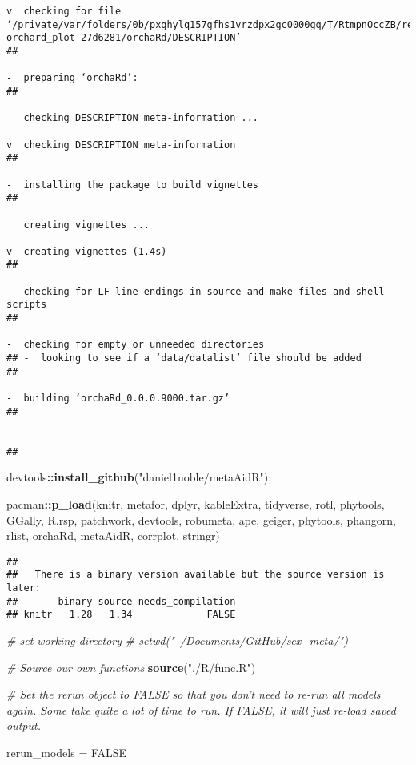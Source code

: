 \documentclass[]{article}
\newenvironment{Shaded}{\begin{snugshade}}{\end{snugshade}}
\newcommand{\KeywordTok}[1]{\textcolor[rgb]{0.13,0.29,0.53}{\textbf{#1}}}
\newcommand{\StringTok}[1]{\textcolor[rgb]{0.31,0.60,0.02}{#1}}
\newcommand{\CommentTok}[1]{\textcolor[rgb]{0.56,0.35,0.01}{\textit{#1}}}
\newcommand{\OtherTok}[1]{\textcolor[rgb]{0.56,0.35,0.01}{#1}}
\newcommand{\OperatorTok}[1]{\textcolor[rgb]{0.81,0.36,0.00}{\textbf{#1}}}
\newcommand{\NormalTok}[1]{#1}
\begin{document}
\begin{verbatim}
v  checking for file ‘/private/var/folders/0b/pxghylq157gfhs1vrzdpx2gc0000gq/T/RtmpnOccZB/remotes31ac7b962c89/itchyshin-orchard_plot-27d6281/orchaRd/DESCRIPTION’
## 
  
-  preparing ‘orchaRd’:
## 
  
   checking DESCRIPTION meta-information ...
  
v  checking DESCRIPTION meta-information
## 
  
-  installing the package to build vignettes
## 
  
   creating vignettes ...
  
v  creating vignettes (1.4s)
## 
  
-  checking for LF line-endings in source and make files and shell scripts
## 
  
-  checking for empty or unneeded directories
## -  looking to see if a ‘data/datalist’ file should be added
## 
  
-  building ‘orchaRd_0.0.0.9000.tar.gz’
## 
  
   
## 
\end{verbatim}

\begin{Shaded}
\begin{Highlighting}[]
\NormalTok{  devtools}\OperatorTok{::}\KeywordTok{install_github}\NormalTok{(}\StringTok{"daniel1noble/metaAidR"}\NormalTok{); }

\NormalTok{pacman}\OperatorTok{::}\KeywordTok{p_load}\NormalTok{(knitr, metafor, dplyr, kableExtra, tidyverse, rotl, phytools, GGally, R.rsp, patchwork, devtools, robumeta, ape, geiger, phytools, phangorn, rlist, orchaRd, metaAidR, corrplot, stringr)}
\end{Highlighting}
\end{Shaded}

\begin{verbatim}
## 
##   There is a binary version available but the source version is later:
##       binary source needs_compilation
## knitr   1.28   1.34             FALSE
\end{verbatim}

\begin{Shaded}
\begin{Highlighting}[]
\CommentTok{# set working directory}
 \CommentTok{# setwd("~/Documents/GitHub/sex_meta/")}
  
\CommentTok{# Source our own functions}
  \KeywordTok{source}\NormalTok{(}\StringTok{"./R/func.R"}\NormalTok{)}
 
\CommentTok{# Set the rerun object to FALSE so that you don't need to re-run all models again. Some take quite a lot of time to run. If FALSE, it will just re-load saved output. }

\NormalTok{  rerun_models =}\StringTok{ }\OtherTok{FALSE}
\end{Highlighting}
\end{Shaded}
\end{document}
